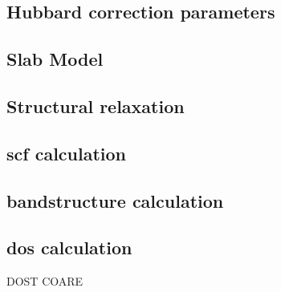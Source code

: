         \subsection{Hubbard correction parameters}
        \subsection{Slab Model}
        \subsection{Structural relaxation}
        \subsection{scf calculation}
        \subsection{bandstructure calculation}
        \subsection{dos calculation}

DOST COARE